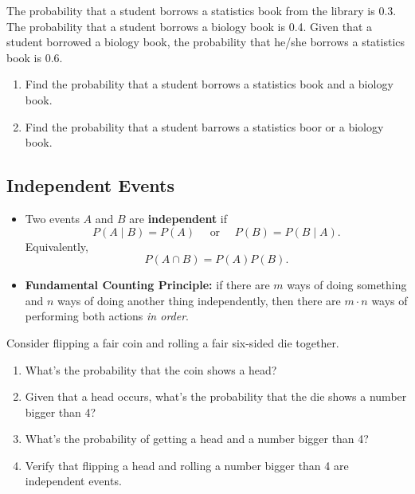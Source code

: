 \begin{example}

  The probability that a student borrows a statistics book from the
  library is 0.3. The probability that a student borrows a biology book is
  0.4. Given that a student borrowed a biology book, the probability that
  he/she borrows a statistics book is 0.6.
  
  \begin{enumerate}
  \item
    Find the probability that a student borrows a statistics book and a
    biology book.
  \item
    Find the probability that a student barrows a statistics boor or a
    biology book.
  \end{enumerate}
  
  \end{example}

\hypertarget{independent-events}{%
\subsection{Independent Events}\label{independent-events}}

\begin{itemize}
\item
  Two events \(A\) and \(B\) are \textbf{independent} if \[
  P(A\mid B)=P(A)\quad \text{ or }
  \quad P(B)=P(B\mid A).
  \] Equivalently, \[
  P(A\cap B)=P(A)P(B).
  \]
\item
  \textbf{Fundamental Counting Principle:} if there are \(m\) ways of
  doing something and \(n\) ways of doing another thing independently,
  then there are \(m\cdot n\) ways of performing both actions \emph{in
  order}.
\end{itemize}

\begin{example}

  Consider flipping a fair coin and rolling a fair six-sided die together.
  
  \begin{enumerate}
  \item
    What's the probability that the coin shows a head?
  \item
    Given that a head occurs, what's the probability that the die shows a
    number bigger than 4?
  \item
    What's the probability of getting a head and a number bigger than 4?
  \item
    Verify that flipping a head and rolling a number bigger than 4 are
    independent events.
  \end{enumerate}
  
  \end{example}

